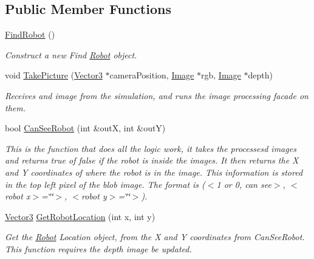 \subsection*{Public Member Functions}
\begin{DoxyCompactItemize}
\item 
\mbox{\label{classFindRobot_a55011d75f3703849bf1e8bd49ea72a4c}} 
\hyperlink{classFindRobot_a55011d75f3703849bf1e8bd49ea72a4c}{Find\+Robot} ()
\begin{DoxyCompactList}\small\item\em Construct a new Find \hyperlink{classRobot}{Robot} object. \end{DoxyCompactList}\item 
void \hyperlink{classFindRobot_a27fed71d7793129a281fc7a3174d328b}{Take\+Picture} (\hyperlink{classVector3}{Vector3} $\ast$camera\+Position, \hyperlink{classImage}{Image} $\ast$rgb, \hyperlink{classImage}{Image} $\ast$depth)
\begin{DoxyCompactList}\small\item\em Receives and image from the simulation, and runs the image processing facade on them. \end{DoxyCompactList}\item 
bool \hyperlink{classFindRobot_ae26378cc41e2e3c61e4833ec0e7b1d76}{Can\+See\+Robot} (int \&outX, int \&outY)
\begin{DoxyCompactList}\small\item\em This is the function that does all the logic work, it takes the processesd images and returns true of false if the robot is inside the images. It then returns the X and Y coordinates of where the robot is in the image. This information is stored in the top left pixel of the blob image. The format is ($<$1 or 0, can see$>$, $<$robot x$>$=\char`\"{}\char`\"{}$>$, $<$robot y$>$=\char`\"{}\char`\"{}$>$). \end{DoxyCompactList}\item 
\hyperlink{classVector3}{Vector3} \hyperlink{classFindRobot_acab7123d6f276e150b87ea30f1f287d4}{Get\+Robot\+Location} (int x, int y)
\begin{DoxyCompactList}\small\item\em Get the \hyperlink{classRobot}{Robot} Location object, from the X and Y coordinates from Can\+See\+Robot. This function requires the depth image be updated. \end{DoxyCompactList}\item 
\mbox{\label{classFindRobot_a63e77c7b9a876332fc3fb411bb6644a9}} 

\end{DoxyCompactItemize}
